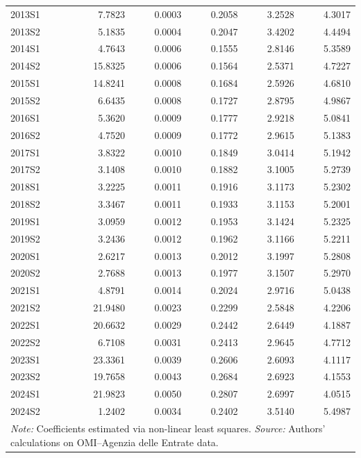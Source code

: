 \begin{landscape}
\begin{table}[!ht]
\begin{tabular}{lrrrrr}
    2013S1 &   7.7823 & 0.0003 & 0.2058 & 3.2528 & 4.3017 \\
    2013S2 &   5.1835 & 0.0004 & 0.2047 & 3.4202 & 4.4494 \\
    2014S1 &   4.7643 & 0.0006 & 0.1555 & 2.8146 & 5.3589 \\
    2014S2 &  15.8325 & 0.0006 & 0.1564 & 2.5371 & 4.7227 \\
    2015S1 &  14.8241 & 0.0008 & 0.1684 & 2.5926 & 4.6810 \\
    2015S2 &   6.6435 & 0.0008 & 0.1727 & 2.8795 & 4.9867 \\
    2016S1 &   5.3620 & 0.0009 & 0.1777 & 2.9218 & 5.0841 \\
    2016S2 &   4.7520 & 0.0009 & 0.1772 & 2.9615 & 5.1383 \\
    2017S1 &   3.8322 & 0.0010 & 0.1849 & 3.0414 & 5.1942 \\
    2017S2 &   3.1408 & 0.0010 & 0.1882 & 3.1005 & 5.2739 \\
    2018S1 &   3.2225 & 0.0011 & 0.1916 & 3.1173 & 5.2302 \\
    2018S2 &   3.3467 & 0.0011 & 0.1933 & 3.1153 & 5.2001 \\
    2019S1 &   3.0959 & 0.0012 & 0.1953 & 3.1424 & 5.2325 \\
    2019S2 &   3.2436 & 0.0012 & 0.1962 & 3.1166 & 5.2211 \\
    2020S1 &   2.6217 & 0.0013 & 0.2012 & 3.1997 & 5.2808 \\
    2020S2 &   2.7688 & 0.0013 & 0.1977 & 3.1507 & 5.2970 \\
    2021S1 &   4.8791 & 0.0014 & 0.2024 & 2.9716 & 5.0438 \\
    2021S2 &  21.9480 & 0.0023 & 0.2299 & 2.5848 & 4.2206 \\
    2022S1 &  20.6632 & 0.0029 & 0.2442 & 2.6449 & 4.1887 \\
    2022S2 &   6.7108 & 0.0031 & 0.2413 & 2.9645 & 4.7712 \\
    2023S1 &  23.3361 & 0.0039 & 0.2606 & 2.6093 & 4.1117 \\
    2023S2 &  19.7658 & 0.0043 & 0.2684 & 2.6923 & 4.1553 \\
    2024S1 &  21.9823 & 0.0050 & 0.2807 & 2.6997 & 4.0515 \\
    2024S2 &   1.2402 & 0.0034 & 0.2402 & 3.5140 & 5.4987 \\
    \hline
    \multicolumn{6}{l}{\textit{Note:} Coefficients estimated via non-linear least squares. \textit{Source:} Authors' calculations on OMI--Agenzia delle Entrate data.} \\
  \end{tabular}
\end{table}
\end{landscape}

